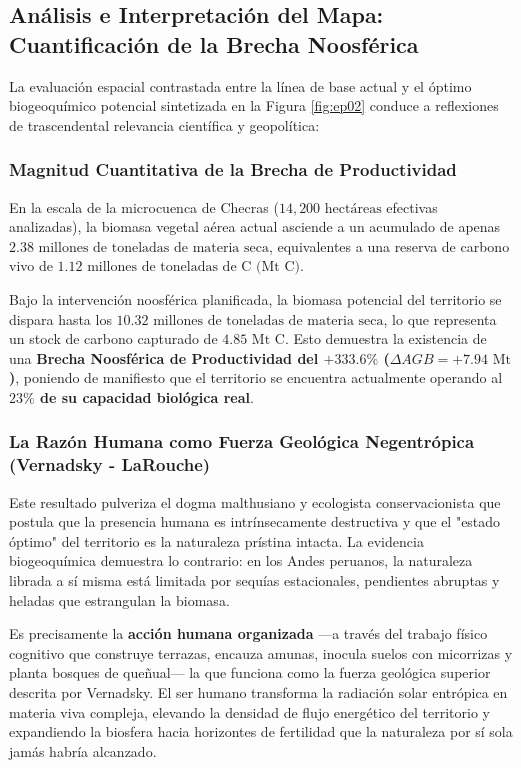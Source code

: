 \documentclass[11pt,a4paper]{article}
\begin{document}
\subsection{Análisis e Interpretación del Mapa: Cuantificación de la Brecha Noosférica}
La evaluación espacial contrastada entre la línea de base actual y el óptimo biogeoquímico potencial sintetizada en la Figura \ref{fig:ep02} conduce a reflexiones de trascendental relevancia científica y geopolítica:

\subsubsection{Magnitud Cuantitativa de la Brecha de Productividad}
En la escala de la microcuenca de Checras ($14,200\text{ hectáreas}$ efectivas analizadas), la biomasa vegetal aérea actual asciende a un acumulado de apenas $2.38\text{ millones de toneladas de materia seca}$, equivalentes a una reserva de carbono vivo de $1.12\text{ millones de toneladas de C (Mt C)}$. 

Bajo la intervención noosférica planificada, la biomasa potencial del territorio se dispara hasta los \textbf{$10.32\text{ millones de toneladas de materia seca}$}, lo que representa un stock de carbono capturado de \textbf{$4.85\text{ Mt C}$}. Esto demuestra la existencia de una \textbf{Brecha Noosférica de Productividad del $+333.6\%$ ($\Delta AGB = +7.94\text{ Mt}$)}, poniendo de manifiesto que el territorio se encuentra actualmente operando al \textbf{$23\%$ de su capacidad biológica real}.

\subsubsection{La Razón Humana como Fuerza Geológica Negentrópica (Vernadsky - LaRouche)}
Este resultado pulveriza el dogma malthusiano y ecologista conservacionista que postula que la presencia humana es intrínsecamente destructiva y que el "estado óptimo" del territorio es la naturaleza prístina intacta. La evidencia biogeoquímica demuestra lo contrario: en los Andes peruanos, la naturaleza librada a sí misma está limitada por sequías estacionales, pendientes abruptas y heladas que estrangulan la biomasa.

Es precisamente la \textbf{acción humana organizada} —a través del trabajo físico cognitivo que construye terrazas, encauza amunas, inocula suelos con micorrizas y planta bosques de queñual— la que funciona como la fuerza geológica superior descrita por Vernadsky. El ser humano transforma la radiación solar entrópica en materia viva compleja, elevando la densidad de flujo energético del territorio y expandiendo la biosfera hacia horizontes de fertilidad que la naturaleza por sí sola jamás habría alcanzado.
\end{document}

